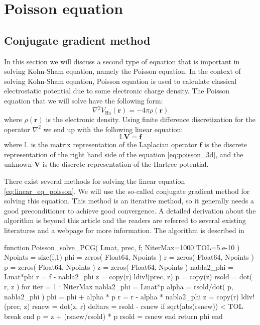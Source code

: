 \chapter{Poisson equation}

\section{Conjugate gradient method}

In this section we will discuss a second type of equation
that is important in solving Kohn-Sham equation,
namely the Poisson equation. In the
context of solving Kohn-Sham equation, Poisson equation is used to
calculate classical electrostatic potential due to some electronic
charge density.
The Poisson equation that we will solve have the following form:
\begin{equation}
\nabla^2 V_{\mathrm{Ha}}(\mathbf{r}) = -4\pi\rho(\mathbf{r})
\label{eq:poisson_3d}
\end{equation}
where $\rho(\mathbf{r})$ is the electronic density. Using finite
difference discretization for the operator $\nabla^2$ we end up with
the following linear equation:
\begin{equation}
\mathbb{L} \mathbf{V} = \mathbf{f}
\label{eq:linear_eq_poisson}
\end{equation}
where $\mathbb{L}$ is the matrix representation of the Laplacian operator
$\mathbf{f}$ is the discrete representation of the right hand side of the equation
\ref{eq:poisson_3d}, and the unknown $\mathbf{V}$ is the discrete representation of
the Hartree potential.

There exist several methods for solving the linear equation \ref{eq:linear_eq_poisson}.
We will use the so-called conjugate gradient method for solving this equation.
This method is an iterative method, so it generally needs a good preconditioner to
achieve good convergence. A detailed derivation about the algorithm is beyond this
article and the readers are referred to several existing literatures \cite{Hestenes1952,Shewchuk1994}
and a webpage \cite{wiki-Conjugate-gradient} for more
information. The algorithm is described in 

\begin{juliacode}
function Poisson_solve_PCG( Lmat, prec, f; NiterMax=1000 TOL=5.e-10 )
  Npoints = size(f,1)
  phi = zeros( Float64, Npoints )
  r = zeros( Float64, Npoints )
  p = zeros( Float64, Npoints )
  z = zeros( Float64, Npoints )
  nabla2_phi = Lmat*phi
  r = f - nabla2_phi
  z = copy(r)
  ldiv!(prec, z)
  p = copy(z)
  rsold = dot( r, z )
  for iter = 1 : NiterMax
    nabla2_phi = Lmat*p
    alpha = rsold/dot( p, nabla2_phi )
    phi = phi + alpha * p
    r = r - alpha * nabla2_phi
    z = copy(r)
    ldiv!(prec, z)
    rsnew = dot(z, r)
    deltars = rsold - rsnew
    if sqrt(abs(rsnew)) < TOL
      break
    end
    p = z + (rsnew/rsold) * p
    rsold = rsnew
  end
  return phi
end
\end{juliacode}

